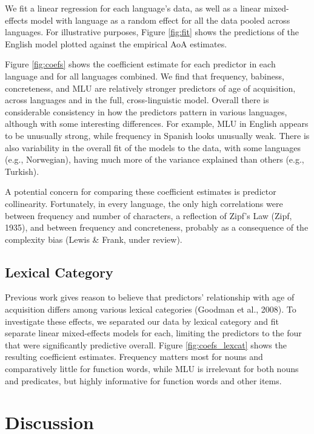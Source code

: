 \documentclass[10pt, letterpaper]{article}
\begin{document}
We fit a linear regression for each language's data, as well as a linear
mixed-effects model with language as a random effect for all the data
pooled across languages. For illustrative purposes, Figure \ref{fig:fit}
shows the predictions of the English model plotted against the empirical
AoA estimates.

Figure \ref{fig:coefs} shows the coefficient estimate for each predictor
in each language and for all languages combined. We find that frequency,
babiness, concreteness, and MLU are relatively stronger predictors of
age of acquisition, across languages and in the full, cross-linguistic
model. Overall there is considerable consistency in how the predictors
pattern in various languages, although with some interesting
differences. For example, MLU in English appears to be unusually strong,
while frequency in Spanish looks unusually weak. There is also
variability in the overall fit of the models to the data, with some
languages (e.g., Norwegian), having much more of the variance explained
than others (e.g., Turkish).

A potential concern for comparing these coefficient estimates is
predictor collinearity. Fortunately, in every language, the only high
correlations were between frequency and number of characters, a
reflection of Zipf's Law (Zipf, 1935), and between frequency and
concreteness, probably as a consequence of the complexity bias (Lewis \&
Frank, under review).

\subsection{Lexical Category}\label{lexical-category}

Previous work gives reason to believe that predictors' relationship with
age of acquisition differs among various lexical categories (Goodman et
al., 2008). To investigate these effects, we separated our data by
lexical category and fit separate linear mixed-effects models for each,
limiting the predictors to the four that were significantly predictive
overall. Figure \ref{fig:coefs_lexcat} shows the resulting coefficient
estimates. Frequency matters most for nouns and comparatively little for
function words, while MLU is irrelevant for both nouns and predicates,
but highly informative for function words and other items.

\section{Discussion}\label{discussion}
\end{document}

